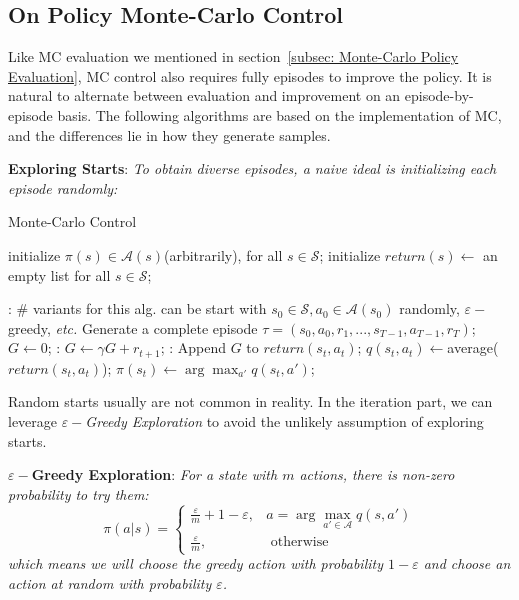 \documentclass{progartcn}
\begin{document}
		\subsection{On Policy Monte-Carlo Control}

			Like MC evaluation we mentioned in section~\ref{subsec: Monte-Carlo Policy Evaluation}, MC control also requires fully episodes to improve the policy. It is natural to alternate between evaluation and improvement on an episode-by-episode basis. The following algorithms are based on the implementation of MC, and the differences lie in how they generate samples.

			\textbf{Exploring Starts}: \textit{To obtain diverse episodes, a naive ideal is initializing each episode randomly:}
			
			\begin{algorithm}[h]
			\caption{Monte-Carlo Control}
			\label{alg: Monte-Carlo Control}
			\begin{algorithmic}[1]
			\State initialize $\pi(s)\in \mathcal{A}(s)$(arbitrarily), for all $s\in \mathcal{S}$; initialize $return(s)\gets$ an empty list for all $s\in\mathcal{S}$;
	        
            :
            	\Statex \# variants for this alg. can be start with $s_0\in\mathcal{S},a_0\in\mathcal{A}(s_0)$ randomly, $\varepsilon-$greedy, \textit{etc.}
            	\State Generate a complete episode $\tau=(s_0, a_0, r_1,...,s_{T-1},a_{T-1},r_{T})$;
            	\State $G\gets0$;
            	:
            		\State $G\gets\gamma G+r_{t+1}$;
            		:
            			\State Append $G$ to $return(s_t, a_t)$;
            			\State $q(s_t,a_t)\gets$average($return(s_t,a_t)$);
            			\State $\pi(s_t)\gets\arg\max_{a'}q(s_t,a')$;
            		\EndIf
            	\EndFor
            \EndFor
	        \end{algorithmic}
	        \end{algorithm}

			Random starts usually are not common in reality. In the iteration part, we can leverage \textit{$\varepsilon-$Greedy Exploration} to avoid the unlikely assumption of exploring starts.

			\textbf{$\varepsilon-$Greedy Exploration}: \textit{For a state with $m$ actions, there is non-zero probability to try them:}
			\[\pi(a|s)=\begin{cases}\frac{\varepsilon}{m}+1-\varepsilon, & a=\arg\max_{a'\in\mathcal{A}}q(s,a')\\\frac{\varepsilon}{m}, & \text{ otherwise}\end{cases}\]
			\textit{which means we will choose the greedy action with probability $1-\varepsilon$ and choose an action at random with probability $\varepsilon$.}
\end{document}
